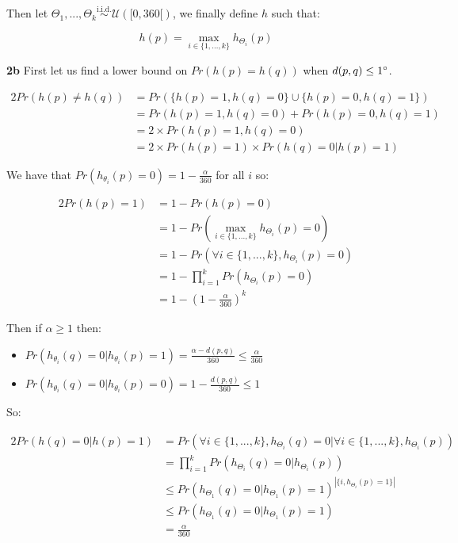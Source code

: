 \documentclass[10pt,a4paper]{article}
\theoremstyle{plain}
\begin{document}
Then let $\Theta_1, ..., \Theta_k \overset{\text{i.i.d.}}{\sim} \mathcal{U}([0, 360[)$, we finally define $h$ such that:

$$
h(p) = \underset{i \in \{1, ..., k\}}{\max}{h_{\Theta_i}(p)}
$$

\textbf{2b} First let us find a lower bound on $Pr(h(p) = h(q))$ when $d(p, q) \leq 1\degree$.

\begin{alignat*}{2}
Pr(h(p) \neq h(q)) & = Pr(\{h(p) = 1, h(q) = 0\} \cup \{h(p) = 0, h(q) = 1\}) \\
& = Pr(h(p) = 1, h(q) = 0) + Pr(h(p) = 0, h(q) = 1) \\
& = 2 \times Pr(h(p) = 1, h(q) = 0) \\
& = 2 \times Pr(h(p) = 1) \times Pr(h(q) = 0 | h(p) = 1)
\end{alignat*}

We have that $Pr(h_{\theta_i}(p) = 0) = 1 - \frac{\alpha}{360}$ for all $i$ so:

\begin{alignat*}{2}
Pr(h(p) = 1) & = 1 - Pr(h(p) = 0) \\
& = 1 - Pr(\underset{i \in \{1, ..., k\}}{\max}{h_{\Theta_i}(p)} = 0) \\
& = 1 - Pr(\forall i \in \{1, ..., k\}, h_{\Theta_i}(p) = 0) \\
& = 1 - \prod_{i=1}^k{Pr(h_{\Theta_i}(p) = 0)} \\
& = 1 - \left(1 - \frac{\alpha}{360}\right)^k
\end{alignat*}

Then if $\alpha \geq 1$ then:
\begin{itemize}
\item $Pr(h_{\theta_i}(q) = 0 | h_{\theta_i}(p) = 1) = \frac{\alpha - d(p, q)}{360} \leq \frac{\alpha}{360}$
\item $Pr(h_{\theta_i}(q) = 0 | h_{\theta_i}(p) = 0) = 1 - \frac{d(p, q)}{360} \leq 1$
\end{itemize}

So:

\begin{alignat*}{2}
Pr(h(q) = 0 | h(p) = 1) & = Pr(\forall i \in \{1, ..., k\}, h_{\Theta_i}(q) = 0 | \forall i \in \{1, ..., k\}, h_{\Theta_i}(p)) \\
& = \prod_{i=1}^k{Pr(h_{\Theta_i}(q) = 0 | h_{\Theta_i}(p))} \\
& \leq Pr(h_{\Theta_1}(q) = 0 | h_{\Theta_1}(p) = 1)^{|\{i, h_{\Theta_i}(p) = 1\}|} \\
& \leq Pr(h_{\Theta_1}(q) = 0 | h_{\Theta_1}(p) = 1) \\
& = \frac{\alpha}{360}
\end{alignat*}
\end{document}
